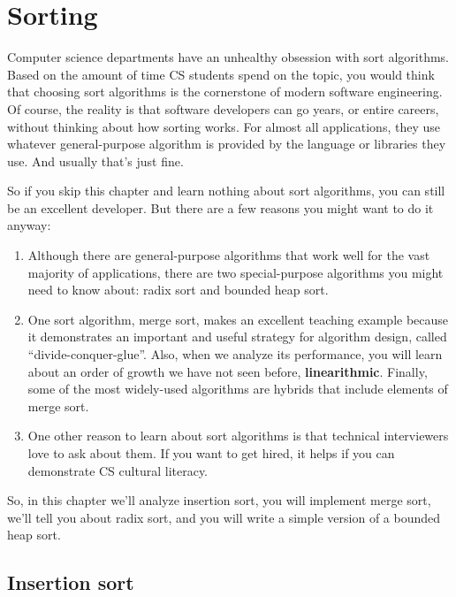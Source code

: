 \documentclass[12pt]{book}
\theoremstyle{exercise}
\begin{document}
\chapter{Sorting}

Computer science departments have an unhealthy obsession with sort
algorithms. Based on the amount of time CS students spend on the topic,
you would think that choosing sort algorithms is the cornerstone of
modern software engineering. Of course, the reality is that software
developers can go years, or entire careers, without thinking about how
sorting works. For almost all applications, they use whatever
general-purpose algorithm is provided by the language or libraries they
use. And usually that's just fine.

So if you skip this chapter and learn nothing about sort algorithms, you can
still be an excellent developer. But there are a few reasons you might
want to do it anyway:

\begin{enumerate}

\item
  Although there are general-purpose algorithms that work well for the
  vast majority of applications, there are two special-purpose
  algorithms you might need to know about: radix sort and bounded heap
  sort.

\item
  One sort algorithm, merge sort, makes an excellent teaching example
  because it demonstrates an important and useful strategy for
  algorithm design, called ``divide-conquer-glue''. Also, when we
  analyze its performance, you will learn about an order of growth we
  have not seen before, {\bf linearithmic}. Finally, some of the most
  widely-used algorithms are hybrids that include elements of merge
  sort.

\item
  One other reason to learn about sort algorithms is that technical
  interviewers love to ask about them. If you want to get hired, it
  helps if you can demonstrate CS cultural literacy.

\end{enumerate}

So, in this chapter we'll analyze insertion sort, you will implement merge
sort, we'll tell you about radix sort, and you will write a simple
version of a bounded heap sort.


\section{Insertion sort}
\label{insertion-sort}
\end{document}
